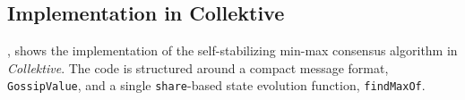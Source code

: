 \documentclass[runningheads]{llncs}
\newcommand{\ck}{\emph{Collektive}}
\begin{document}
%
%
%
%
%
\subsection{Implementation in Collektive}
\label{subsec:field-based-gossip-algorithm}

\begin{figure}[!t]
    \centering
    
\end{figure}

,
shows the implementation of the self-stabilizing min-max consensus algorithm in \ck{}.
%
The code is structured around a compact message format, \lstinline|GossipValue|,
and a single \lstinline|share|-based state evolution function, \lstinline|findMaxOf|.
\end{document}
